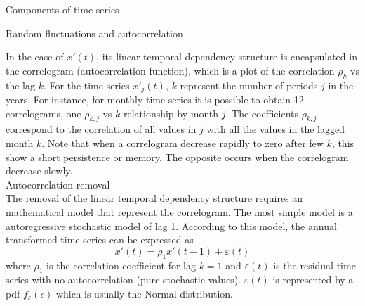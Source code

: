 \documentclass[8pt]{beamer}
\renewcommand{\emph}[1]{\textcolor{myorange}{#1}}
\begin{document}
\begin{frame}{Components of time series}
    \begin{block}{Random fluctuations and autocorrelation}
    \end{block}
    In the case of $x'(t)$, its linear temporal dependency structure is encapsulated in the \alert{correlogram} (\emph{autocorrelation function}), which is a plot of the \emph{correlation} $\rho_k$ vs the lag $k$. For the time series $x'_j (t)$, $k$ represent the number of periods $j$ in the years. For instance, for monthly time series it is possible to obtain 12 \emph{correlograms}, one $\rho_{k,j}$ vs $k$ relationship by month $j$. The coefficients $\rho_{k,j}$ correspond to the correlation of all values in $j$ with  all the values in the lagged month $k$. Note that when a \emph{correlogram} decrease rapidly to zero after few $k$, this show a short \emph{persistence} or \emph{memory}. The opposite occurs when the \emph{correlogram} decrease slowly.\\ 

    \alert{Autocorrelation removal}\\ 

    The removal of the linear temporal dependency structure requires an mathematical model that represent the \emph{correlogram}. The most simple model is a \emph{autoregressive stochastic model} of lag 1. According to this model, the \emph{annual transformed time series} can be expressed as
    \[
        x'(t) = \rho_1 x'(t-1) + \varepsilon (t)
    \]
    where $\rho_1$ is the \emph{correlation coefficient} for lag $k=1$ and $\varepsilon (t)$ is the \alert{residual time series} with no \emph{autocorrelation} (pure stochastic values). $\varepsilon (t)$ is represented by a \emph{pdf} $f_{\varepsilon} (\epsilon)$ which is usually the \emph{Normal distribution}. 
\end{frame}
\end{document}

